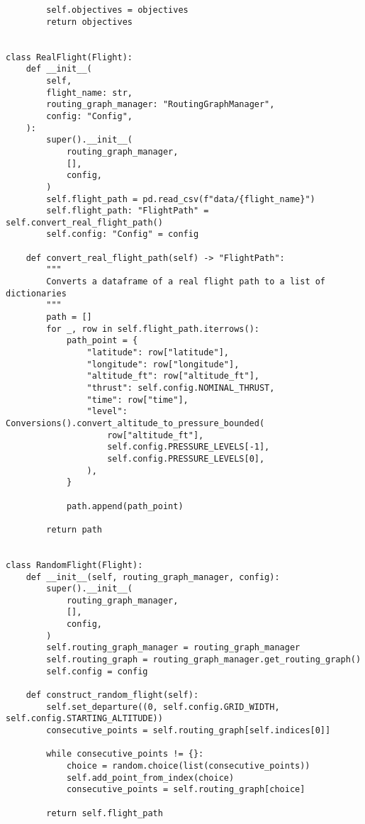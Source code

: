\begin{verbatim}
        self.objectives = objectives
        return objectives


class RealFlight(Flight):
    def __init__(
        self,
        flight_name: str,
        routing_graph_manager: "RoutingGraphManager",
        config: "Config",
    ):
        super().__init__(
            routing_graph_manager,
            [],
            config,
        )
        self.flight_path = pd.read_csv(f"data/{flight_name}")
        self.flight_path: "FlightPath" = self.convert_real_flight_path()
        self.config: "Config" = config

    def convert_real_flight_path(self) -> "FlightPath":
        """
        Converts a dataframe of a real flight path to a list of dictionaries
        """
        path = []
        for _, row in self.flight_path.iterrows():
            path_point = {
                "latitude": row["latitude"],
                "longitude": row["longitude"],
                "altitude_ft": row["altitude_ft"],
                "thrust": self.config.NOMINAL_THRUST,
                "time": row["time"],
                "level": Conversions().convert_altitude_to_pressure_bounded(
                    row["altitude_ft"],
                    self.config.PRESSURE_LEVELS[-1],
                    self.config.PRESSURE_LEVELS[0],
                ),
            }

            path.append(path_point)

        return path


class RandomFlight(Flight):
    def __init__(self, routing_graph_manager, config):
        super().__init__(
            routing_graph_manager,
            [],
            config,
        )
        self.routing_graph_manager = routing_graph_manager
        self.routing_graph = routing_graph_manager.get_routing_graph()
        self.config = config

    def construct_random_flight(self):
        self.set_departure((0, self.config.GRID_WIDTH, self.config.STARTING_ALTITUDE))
        consecutive_points = self.routing_graph[self.indices[0]]

        while consecutive_points != {}:
            choice = random.choice(list(consecutive_points))
            self.add_point_from_index(choice)
            consecutive_points = self.routing_graph[choice]

        return self.flight_path

\end{verbatim}
